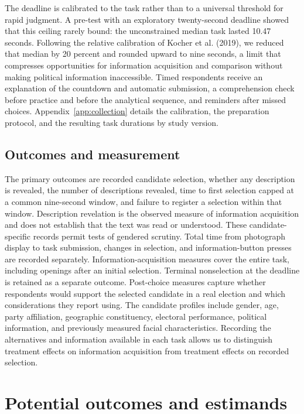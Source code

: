 \documentclass[11pt]{article}\usepackage[]{graphicx}\usepackage[]{xcolor}
\begin{document}
The deadline is calibrated to the task rather than to a universal threshold for rapid judgment. A pre-test with an exploratory twenty-second deadline showed that this ceiling rarely bound: the unconstrained median task lasted 10.47 seconds. Following the relative calibration of Kocher et al. (2019), we reduced that median by 20 percent and rounded upward to nine seconds, a limit that compresses opportunities for information acquisition and comparison without making political information inaccessible. Timed respondents receive an explanation of the countdown and automatic submission, a comprehension check before practice and before the analytical sequence, and reminders after missed choices. Appendix~\ref{app:collection} details the calibration, the preparation protocol, and the resulting task durations by study version.

\subsection{Outcomes and measurement}

The primary outcomes are recorded candidate selection, whether any description is revealed, the number of descriptions revealed, time to first selection capped at a common nine-second window, and failure to register a selection within that window. Description revelation is the observed measure of information acquisition and does not establish that the text was read or understood. These candidate-specific records permit tests of gendered scrutiny. Total time from photograph display to task submission, changes in selection, and information-button presses are recorded separately. Information-acquisition measures cover the entire task, including openings after an initial selection. Terminal nonselection at the deadline is retained as a separate outcome. Post-choice measures capture whether respondents would support the selected candidate in a real election and which considerations they report using. The candidate profiles include gender, age, party affiliation, geographic constituency, electoral performance, political information, and previously measured facial characteristics. Recording the alternatives and information available in each task allows us to distinguish treatment effects on information acquisition from treatment effects on recorded selection.

\section{Potential outcomes and estimands}
\label{sec:estimands}
\end{document}
